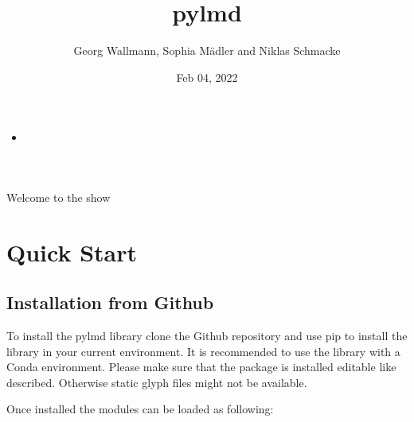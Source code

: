 \documentclass[letterpaper,10pt,english,openany,oneside]{sphinxmanual}
\title{py\sphinxhyphen{}lmd}
\date{Feb 04, 2022}
\author{Georg Wallmann, Sophia Mädler and Niklas Schmacke}
\begin{document}
\pagestyle{empty}
\sphinxmaketitle
\pagestyle{plain}
\sphinxtableofcontents
\pagestyle{normal}
\label{\detokenize{index::doc}}


\begin{sphinxShadowBox}
\begin{itemize}
\item {} 
\sphinxAtStartPar
{}\label{\detokenize{index:id1}}{\hyperref[\detokenize{index:overview}]{}}

\end{itemize}
\end{sphinxShadowBox}

\sphinxAtStartPar
Welcome to the show


\chapter{Quick Start}
\label{\detokenize{pages/quickstart:quick-start}}\label{\detokenize{pages/quickstart::doc}}

\section{Installation from Github}
\label{\detokenize{pages/quickstart:installation-from-github}}
\sphinxAtStartPar
To install the py\sphinxhyphen{}lmd library clone the Github repository and use pip to install the library in your current environment. It is recommended to use the library with a Conda environment. Please make sure that the package is installed editable like described. Otherwise static glyph files might not be available.

\begin{sphinxVerbatim}[commandchars=\\\{\}]
  
   
\end{sphinxVerbatim}

\sphinxAtStartPar
Once installed the modules can be loaded as following:

\begin{sphinxVerbatim}[commandchars=\\\{\}]
    
\end{sphinxVerbatim}
\end{document}
